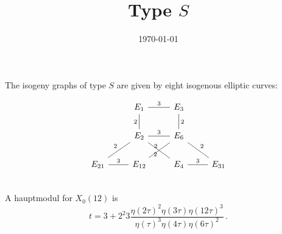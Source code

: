 \documentclass[11pt]{article}
\theoremstyle{definition}
\begin{document}
\title{Type $S$}
\date{\today}
\maketitle

 The isogeny graphs of type $S$ are given by
eight isogenous elliptic curves:

\[ \begin{tikzcd}
  & E_1 \ar[dash,swap,d,"2"] \ar[dash,r,"3"]   & E_3 \ar[dash,d,"2"] & \\
  & E_2 \ar[dash,swap,dl,"2"] \ar[dash,swap,dr,"2"] \ar[dash,r,"3"]   & E_6  \ar[dash,swap,dl,"2"] \ar[dash,dr,"2"]  & \\
    E_{21} \ar[dash,r,"3"] &   E_{12} & E_ 4 \ar[dash,r,"3"]    & E_{31}  \\
\end{tikzcd}
\]
 A hauptmodul for $X_0(12)$ is  
$$
t = 
\displaystyle{
  3 + 2^2 3 \frac{\eta(2\tau)^2 \eta(3\tau) \eta(12\tau)^3}{\eta(\tau)^3 \eta(4\tau) \eta(6\tau)^2}}\,.
$$

\newpage
\end{document}
